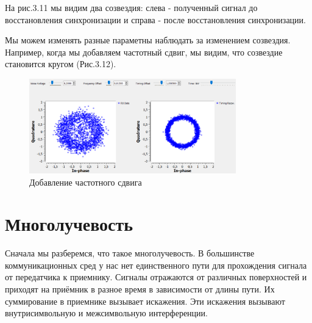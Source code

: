 \documentclass[a4paper,12pt]{report}
\begin{document}
    На рис.3.11 мы видим два созвездия: слева - полученный сигнал до восстановления синхронизации и справа - после восстановления синхронизации. 
    
    Мы можем изменять разные параметны  наблюдать за изменением созвездия. Например, когда мы добавляем частотный сдвиг, мы видим, что созвездие становится кругом (Рис.3.12).
\begin{figure}[H]
        \centering
        \includegraphics[width=0.8\textwidth]{fig3-12.PNG}
        \caption{Добавление частотного сдвига}
        \label{fig:fig3-12}
\end{figure}

\chapter{Многолучевость}
    Сначала мы разберемся, что такое многолучевость. В большинстве коммуникационных сред у нас нет единственного пути для прохождения сигнала от передатчика к приемнику. Сигналы отражаются от различных поверхностей и приходят на приёмник в разное время в зависимости от длины пути. Их суммирование в приемнике вызывает искажения. Эти искажения вызывают внутрисимвольную и межсимвольную интерференции. 
    
\end{document}
